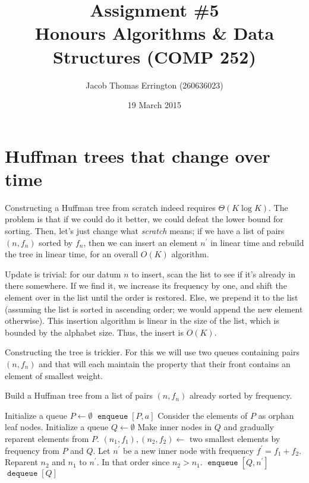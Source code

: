 \documentclass{article}
\title{Assignment \#5\\Honours Algorithms \& Data Structures (COMP 252)}
\author{Jacob Thomas Errington (260636023)}
\date{19 March 2015}
\DeclareMathOperator{\enqueue}{\mathtt{enqueue}}
\DeclareMathOperator{\dequeue}{\mathtt{dequeue}}
\begin{document}
\maketitle

\section{Huffman trees that change over time}

Constructing a Huffman tree from scratch indeed requires $\Theta{(K \log K)}$.
The problem is that if we could do it better, we could defeat the lower bound
for sorting. Then, let's just change what \emph{scratch} means; if we have a
list of pairs $(n, f_n)$ sorted by $f_n$, then we can insert an element
$n^\prime$ in linear time and rebuild the tree in linear time, for an overall
$O(K)$ algorithm.

Update is trivial: for our datum $n$ to insert, scan the list to see if it's
already in there somewhere. If we find it, we increase its frequency by one,
and shift the element over in the list until the order is restored. Else, we
prepend it to the list (assuming the list is sorted in ascending order; we
would append the new element otherwise). This insertion algorithm is linear in
the size of the list, which is bounded by the alphabet size. Thus, the insert
is $O(K)$.

Constructing the tree is trickier. For this we will use two queues containing
pairs $(n, f_n)$ and that will each maintain the property that their front
contains an element of smallest weight.

\begin{algorithm}[H]
    \caption{Build a Huffman tree from a list of pairs $(n, f_n)$ already
        sorted by frequency.}
    \begin{algorithmic}

            \State Initialize a queue $P \gets \emptyset$
                \State $\enqueue{[P, a]}$
            \EndFor
            \State \Comment Consider the elements of $P$ as orphan leaf nodes.
            \State Initialize a queue $Q \gets \emptyset$
            \State \Comment Make inner nodes in $Q$ and gradually reparent
                elements from $P$.
                \State $(n_1, f_1), (n_2, f_2) \gets$ two smallest
                    elements by frequency from $P$ and $Q$.
                \State Let $n^\prime$ be a new inner node with frequency
                    $f^\prime = f_1 + f_2$.
                \State Reparent $n_2$ and $n_1$ to $n^\prime$.
                    \Comment In that order since $n_2 > n_1$.
                \State $\enqueue{[Q, n^\prime]}$
            \EndWhile
            \State \Return $\dequeue{[Q]}$
        \EndFunction
    \end{algorithmic}
\end{algorithm}
\end{document}
